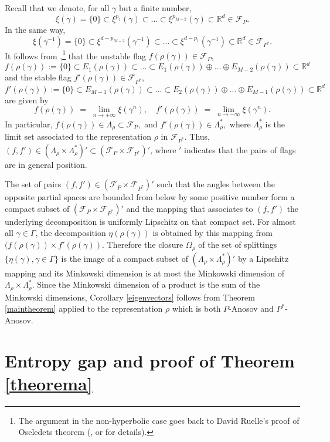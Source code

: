 \documentclass[JEP,XML,SOM,Unicode,NoEqCountersInSection,published]{cedram}
\newcommand{\R}{\mathbb{R}}
\newcommand{\F}{\mathcal{F}}
\let\G\Gamma
\let\g\gamma
\let\La\Lambda
\let\Om\Omega
\let\x\times
\begin{document}
Recall that we denote, for all \(\g\) but a finite number,
\[
\xi(\gamma) = \{0\} \subset \xi^{p_1}(\gamma) \subset \ldots \subset \xi^{p_{M-2}}(\gamma)\subset \R^d \in \F_P.
\]
In the same way,
\[
\xi(\gamma^{-1}) = \{0\} \subset \xi^{d-p_{M-2}}(\gamma^{-1}) \subset \ldots \subset \xi^{d-p_1}(\gamma^{-1})\subset \R^d \in \F_{P^\ast}.
\]
It follows from \cite[Lem.\,2.26]{GGKW17},\footnote{The argument in the non-hyperbolic case goes back to David Ruelle's proof of Oseledets theorem (\cite{Rue79}, \cf \cite[Prop.\,3.2]{Led84} or \cite[p.\,141--142]{Sim15} for details).}
that the unstable flag \(f(\rho (\g)) \in \F_P\),
\[
 f(\rho (\g)) := \{ 0\} \subset E_1(\rho (\g)) \subset \ldots \subset E_1 (\rho (\g)) \oplus \ldots \oplus E_{M-2}(\rho (\g)) \subset \R^d 
\]
and the stable flag \(f'(\rho (\g)) \in \F_{P^\ast}\),
\[
 f'(\rho (\g)) := \{ 0\} \subset E_{M-1}(\rho (\g)) \subset \ldots \subset E_2 (\rho (\g)) \oplus \ldots \oplus E_{M-1}(\rho (\g)) \subset \R^d 
\]
are given by
\[
 f(\rho (\g)) \; =\; \lim_{n\to +\infty} \xi (\g^n), \quad f'(\rho (\g)) \; =\; \lim_{n \to - \infty} \xi (\g^n).
\]
In particular, \(f (\rho (\g)) \in \La_\rho \subset \F_P, \) and \(f'(\rho (\g)) \in \La_\rho^\ast, \) where \(\La_\rho^\ast \) is the limit set associated to the representation \(\rho\) in \(\F_{P^\ast}\). Thus, \((f,f')\in
(\La_\rho \x \La_\rho^\ast)' \subset (\F_{P} \x \F_{P^\ast})'\), where \('\) indicates that the pairs of flags are in general position.

The set of pairs \((f,f') \in (\F_P \x \F_{P^\ast})'\) such that the angles between the opposite partial spaces are bounded from below by some positive number form a compact subset of
\((\F_P \x \F_{P^\ast})'\) and the mapping that associates to \((f,f')\) the underlying decomposition is uniformly Lipschitz on that compact set. For almost all \(\g \in \G\), the decomposition \(\eta (\rho (\g))\) is obtained by this mapping from \((f(\rho (\g)) \x f'(\rho (\g))\). Therefore the closure \(\Om_\rho \) of the set of splittings \(\{ \eta (\g), \g\in \G\} \) is the image of a compact subset of \((\La_\rho \x \La_\rho^\ast)' \) by a Lipschitz mapping and its Minkowski dimension is at most the Minkowski dimension of \(\La_\rho \x \La_\rho^\ast \). Since the Minkowski dimension of a product is the sum of the Minkowski dimensions, Corollary \ref{eigenvectors} follows from Theorem \ref{maintheorem} applied to the representation \(\rho\) which is both \(P \)-Anosov and \(P^\ast\)-Anosov.

\section{Entropy gap and proof of Theorem \ref{theorema}}\label{prooftheorema}
\end{document}
